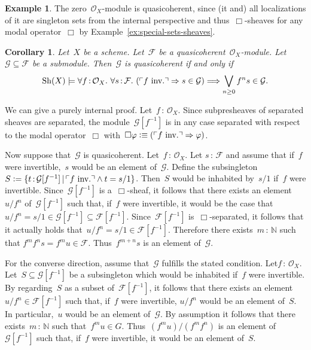 \documentclass[10pt,reqno,a4paper]{amsbook}
\makeatletter
\theoremstyle{definition}
\newtheorem{ex}[defn]{Example}
\theoremstyle{plain}
\newtheorem{cor}[defn]{Corollary}
\theoremstyle{remark}
\newcommand{\F}{\mathcal{F}}
\renewcommand{\G}{\mathcal{G}}
\renewcommand{\O}{\mathcal{O}}
\newcommand{\NN}{\mathbb{N}}
\newcommand{\Sh}{\mathrm{Sh}}
\newcommand{\?}{\,{:}\,}
\renewcommand{\_}{\mathpunct{.}\,}
\newcommand{\speak}[1]{\ulcorner\text{\textnormal{#1}}\urcorner}
\newcommand{\inv}{inv.\@}
\newcommand{\defeq}{\vcentcolon=}
\newcommand{\defequiv}{\vcentcolon\equiv}
\renewenvironment{proof}[1][\proofname]{\par
  \pushQED{\qed}%
  \normalfont \topsep6\p@\@plus6\p@\relax
  \trivlist
  \item[\hskip\labelsep
        \itshape
    #1\@addpunct{.}]\ignorespaces
}{%
  \popQED\endtrivlist\@endpefalse
}
\makeatother
\begin{document}
\begin{ex}The zero~$\O_X$-module is quasicoherent, since (it and) all
localizations of it are singleton sets from the internal perspective and
thus~$\Box$-sheaves for any modal operator~$\Box$
by Example~\ref{ex:special-sets-sheaves}.\end{ex}

\begin{cor}\label{cor:submodule-qcoh}
Let~$X$ be a scheme. Let~$\F$ be a quasicoherent~$\O_X$-module.
Let~$\G \subseteq \F$ be a submodule. Then~$\G$ is quasicoherent if and only
if
\[ \Sh(X) \models \forall f\?\O_X\_
  \forall s\?\F\_
  (\speak{$f$ \inv} \Rightarrow s \in \G) \Longrightarrow
  \bigvee_{n \geq 0} f^n s \in \G. \]
\end{cor}
\begin{proof}We can give a purely internal proof. Let~$f\?\O_X$.
Since subpresheaves of separated sheaves are separated, the module~$\G[f^{-1}]$
is in any case separated with respect to the modal operator~$\Box$
with~$\Box\varphi \defequiv (\speak{$f$ \inv} \Rightarrow \varphi)$.

Now suppose that~$\G$ is quasicoherent. Let~$f\?\O_X$. Let $s\?\F$ and assume that
if~$f$ were invertible,~$s$ would be an element of~$\G$. Define the
subsingleton~$S \defeq \{ t\?\G[f^{-1}] \,|\, \speak{$f$ \inv} \wedge t=s/1 \}$.
Then~$S$ would be inhabited by~$s/1$ if~$f$ were invertible. Since~$\G[f^{-1}]$
is a~$\Box$-sheaf, it follows that there exists an element~$u/f^n$ of~$\G[f^{-1}]$
such that, if~$f$ were invertible, it would be the case that~$u/f^n = s/1 \in
\G[f^{-1}] \subseteq \F[f^{-1}]$.
Since~$\F[f^{-1}]$ is~$\Box$-separated, it follows that it actually holds that~$u/f^n
= s/1 \in \F[f^{-1}]$. Therefore there exists~$m\?\NN$ such that $f^m f^n s =
f^m u \in \F$. Thus~$f^{m+n} s$ is an element of~$\G$.

For the converse direction, assume that~$\G$ fulfills the stated condition.
Let$f\?\O_X$. Let~$S \subseteq \G[f^{-1}]$ be a subsingleton which would be
inhabited if~$f$ were invertible. By regarding~$S$ as a subset of~$\F[f^{-1}]$,
it follows that there exists an element~$u/f^n \in \F[f^{-1}]$ such that,
if~$f$ were invertible, $u/f^n$ would be an element of~$S$. In particular,~$u$
would be an element of~$\G$. By assumption
it follows that there exists~$m\?\NN$ such that~$f^m u \in G$. Thus~$(f^m u) /
(f^m f^n)$ is an element of~$\G[f^{-1}]$ such that, if~$f$ were invertible, it
would be an element of~$S$.
\end{proof}
\end{document}
